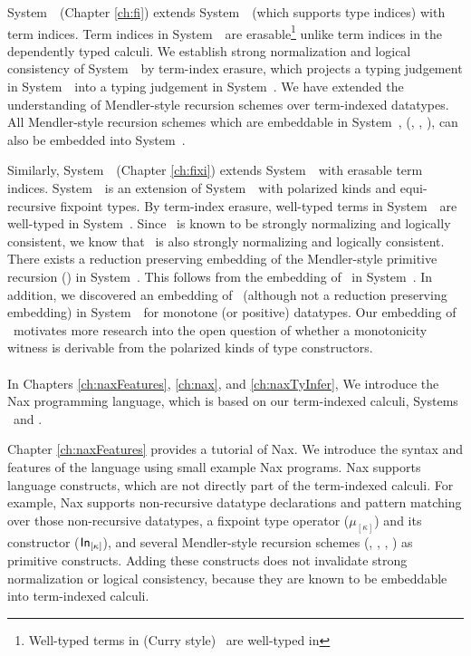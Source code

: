 System~\Fi\ (Chapter \ref{ch:fi}) extends System~\Fw\ (which supports
type indices) with term indices. Term indices in System~\Fi\ are 
erasable\footnote{Well-typed terms in (Curry style) \Fi\ are well-typed in \Fw} unlike term indices in the dependently typed calculi. We establish
strong normalization and logical consistency of System~\Fi\ by
term-index erasure, which projects a typing judgement in System~\Fi\ into
a typing judgement in System~\Fw. We have extended the understanding of
Mendler-style recursion schemes over term-indexed datatypes. All
Mendler-style recursion schemes which are embeddable in System~\Fw,
(\eg, \MIt, \MsfIt), can also be embedded into System~\Fi.

Similarly, System~\Fixi\ (Chapter \ref{ch:fixi}) extends System~\Fixw\ with
erasable term indices. System~\Fixw\ is an extension of System~\Fw\ with
polarized kinds and equi-recursive fixpoint types. By term-index erasure,
well-typed terms in System~\Fixi\ are well-typed in System~\Fixw.
Since \Fixw\ is known to be strongly normalizing and logically consistent,
we know that \Fixi\ is also strongly normalizing and logically consistent.
There exists a reduction preserving embedding of the Mendler-style
primitive recursion (\MPr) in System~\Fixi. This follows from
the embedding of \MPr\ in System~\Fixw. In addition, we discovered
an embedding of \McvPr\ (although not a reduction preserving embedding)
in System~\Fixi\ for monotone (or positive) datatypes. Our embedding of
\McvPr\ motivates more research into the open question of whether a
monotonicity witness is derivable from the polarized kinds of type constructors.

\paragraph{}
In Chapters \ref{ch:naxFeatures}, \ref{ch:nax}, and \ref{ch:naxTyInfer},
We introduce the Nax programming language, which is based on
our term-indexed calculi, Systems \Fi\ and \Fixi.

Chapter \ref{ch:naxFeatures} provides a tutorial of Nax.
We introduce the syntax and features of the language
using small example Nax programs. Nax supports language constructs,
which are not directly part of the term-indexed calculi.
For example, Nax supports non-recursive datatype declarations and
pattern matching over those non-recursive datatypes,
a fixpoint type operator ($\mu_{[\kappa]}$) and
its constructor ($\mathsf{In}_{[\kappa]}$), and
several Mendler-style recursion schemes (\MIt, \MPr, \McvPr, \MsfIt)
as primitive constructs. Adding these constructs does not invalidate
strong normalization or logical consistency, because they are known to
be embeddable into term-indexed calculi.

